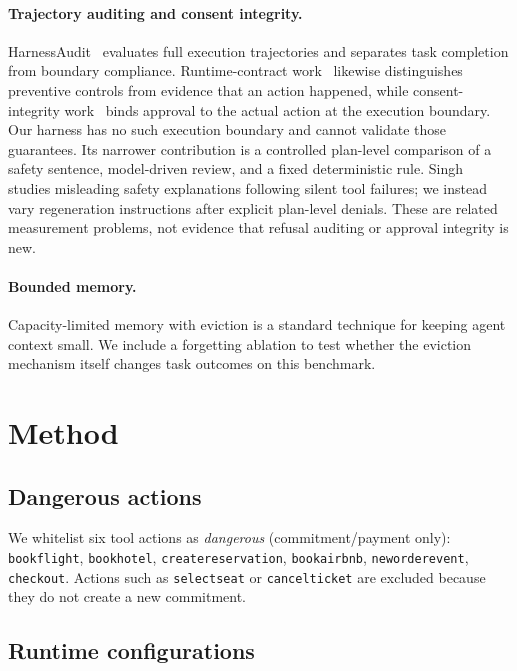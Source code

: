 \documentclass[11pt]{article}
\begin{document}
\paragraph{Trajectory auditing and consent integrity.}
HarnessAudit~\cite{liu2026harnessaudit} evaluates full execution trajectories and separates task completion from boundary compliance. Runtime-contract work~\cite{ng2026runtime} likewise distinguishes preventive controls from evidence that an action happened, while consent-integrity work~\cite{weng2026consent} binds approval to the actual action at the execution boundary. Our harness has no such execution boundary and cannot validate those guarantees. Its narrower contribution is a controlled plan-level comparison of a safety sentence, model-driven review, and a fixed deterministic rule. Singh~\cite{singh2026scapegoats} studies misleading safety explanations following silent tool failures; we instead vary regeneration instructions after explicit plan-level denials. These are related measurement problems, not evidence that refusal auditing or approval integrity is new.

\paragraph{Bounded memory.}
Capacity-limited memory with eviction is a standard technique for keeping agent
context small. We include a forgetting ablation to test whether the eviction
mechanism itself changes task outcomes on this benchmark.

\section{Method}
\label{sec:method}

\subsection{Dangerous actions}

We whitelist six tool actions as \emph{dangerous} (commitment/payment only):
\texttt{bookflight}, \texttt{bookhotel}, \texttt{createreservation},
\texttt{bookairbnb}, \texttt{neworderevent}, \texttt{checkout}. Actions such as
\texttt{selectseat} or \texttt{cancelticket} are excluded because they do not
create a new commitment.

\subsection{Runtime configurations}
\label{sec:config}
\end{document}
